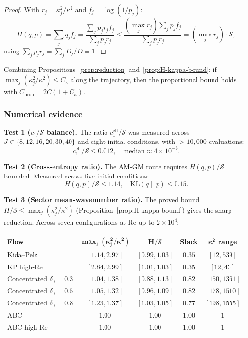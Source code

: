 \documentclass[11pt]{article}
\theoremstyle{definition}
\newcommand{\cS}{\mathcal{S}}
\begin{document}
\begin{proof}
With $r_j = \kappa_j^2/\kappa^2$ and $f_j = \log(1/p_j)$:
\begin{equation}
H(q,p) = \sum_j q_j f_j
= \frac{\sum_j p_j r_j f_j}{\sum_j p_j r_j}
\leq \frac{(\max_j r_j)\sum_j p_j f_j}{\sum_j p_j r_j}
= (\max_j r_j)\cdot\cS,
\end{equation}
using $\sum_j p_j r_j = \sum_j D_j/D = 1$.
\end{proof}

Combining Propositions~\ref{prop:reduction}
and~\ref{prop:H-kappa-bound}: if
$\max_j(\kappa_j^2/\kappa^2) \leq C_\kappa$ along
the trajectory, then the proportional bound holds with
$C_{\mathrm{prop}} = 2C(1 + C_\kappa)$.


\subsubsection{Numerical evidence}

\noindent\textbf{Test 1 ($c_1/\cS$ balance).}
The ratio $c_1^{\mathrm{eff}}/\cS$ was measured across
$J \in \{8,12,16,20,30,40\}$ and eight initial conditions,
with $> 10{,}000$ evaluations:
\begin{equation}
c_1^{\mathrm{eff}}/\cS \leq 0.012,
\quad\text{median} \approx 4\times 10^{-6}.
\end{equation}

\noindent\textbf{Test 2 (Cross-entropy ratio).}
The AM-GM route requires $H(q,p)/\cS$ bounded.
Measured across five initial conditions:
\begin{equation}
H(q,p)/\cS \leq 1.14,
\quad\mathrm{KL}(q\|p) \leq 0.15.
\end{equation}

\noindent\textbf{Test 3 (Sector mean-wavenumber ratio).}
The proved bound $H/\cS \leq \max_j(\kappa_j^2/\kappa^2)$
(Proposition~\ref{prop:H-kappa-bound}) gives the sharp
reduction.  Across seven configurations at
$\mathrm{Re}$ up to $2\times10^4$:
\begin{center}
\begin{tabular}{lcccc}
\toprule
\textbf{Flow} & $\boldsymbol{\max_j(\kappa_j^2/\kappa^2)}$
& $\boldsymbol{H/\cS}$ & \textbf{Slack}
& $\boldsymbol{\kappa^2}$ \textbf{range}\\
\midrule
Kida--Pelz & $[1.14, 2.97]$ & $[0.99, 1.03]$ & $0.35$
& $[12, 539]$ \\
KP high-Re & $[2.84, 2.99]$ & $[1.01, 1.03]$ & $0.35$
& $[12, 43]$ \\
Concentrated $\delta_0\!=\!0.3$ & $[1.04, 1.38]$
& $[0.88, 1.13]$ & $0.82$ & $[150, 1361]$ \\
Concentrated $\delta_0\!=\!0.5$ & $[1.05, 1.32]$
& $[0.96, 1.09]$ & $0.82$ & $[178, 1510]$ \\
Concentrated $\delta_0\!=\!0.8$ & $[1.23, 1.37]$
& $[1.03, 1.05]$ & $0.77$ & $[198, 1555]$ \\
ABC & $1.00$ & $1.00$ & $1.00$ & $1$ \\
ABC high-Re & $1.00$ & $1.00$ & $1.00$ & $1$ \\
\bottomrule
\end{tabular}
\end{center}
\end{document}
